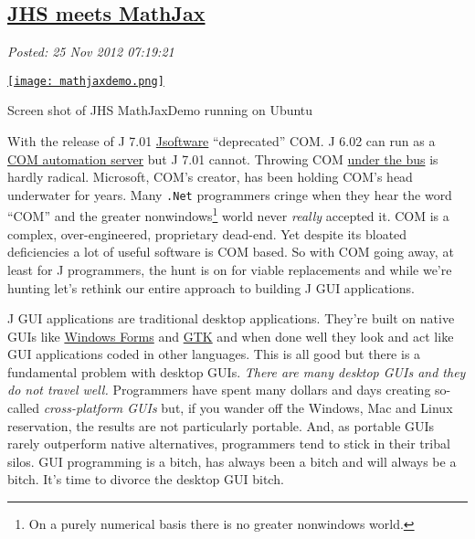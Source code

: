 %

\subsection*{\href{http://bakerjd99.wordpress.com/2012/11/25/jhs-meets-mathjax/}{JHS meets MathJax}}


\noindent\emph{Posted: 25 Nov 2012 07:19:21}
\vspace{6pt}

\captionsetup[floatingfigure]{labelformat=empty}
\begin{floatingfigure}[r]{0.40\textwidth}
\centering
\href{http://bakerjd99.files.wordpress.com/2012/11/mathjaxdemo.png}{\texttt{[image: mathjaxdemo.png]}}
\caption{Screen shot of JHS MathJaxDemo running on Ubuntu}
\label{fig:3402X0}
\end{floatingfigure} With the release of J 7.01 \href{http://www.jsoftware.com}{Jsoftware}
``deprecated'' COM. J 6.02 can run as a
\href{http://en.wikipedia.org/wiki/OLE\_Automation}{COM automation server} 
but J 7.01 cannot. Throwing COM
\href{http://www.youtube.com/watch?v=aix35ZSp46c}{under the bus} is
hardly radical. Microsoft, COM's creator, has been holding COM's head
underwater for years. Many \texttt{.Net} programmers cringe when they
hear the word ``COM'' and the greater
nonwindows\footnote{
On a purely numerical basis there is no greater nonwindows world.
} world never \emph{really}
accepted it. COM is a complex, over-engineered, proprietary dead-end.
Yet despite its bloated deficiencies a lot of useful software is COM
based. So with COM going away, at least for J programmers, the hunt is
on for viable replacements and while we're hunting let's rethink our
entire approach to building J GUI applications.

J GUI applications are traditional desktop applications. They're built
on native GUIs like
\href{http://msdn.microsoft.com/en-us/library/dd30h2yb.aspx}{Windows
Forms} and \href{http://www.gtk.org/}{GTK} and when done well they look
and act like GUI applications coded in other languages. This is all good
but there is a fundamental problem with desktop GUIs. \emph{There are
many desktop GUIs and they do not travel well.} Programmers have spent
many dollars and days creating so-called \emph{cross-platform GUIs} but,
if you wander off the Windows, Mac and Linux reservation, the results
are not particularly portable. And, as portable GUIs rarely outperform
native alternatives, programmers tend to stick in their tribal silos.
GUI programming is a bitch, has always been a bitch and will always be a
bitch. It's time to divorce the desktop GUI bitch.

